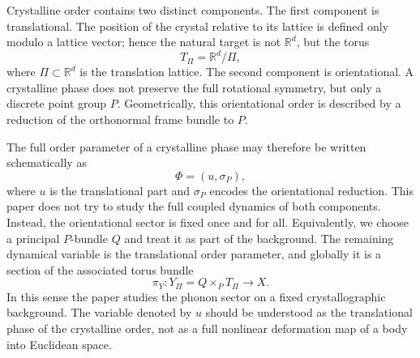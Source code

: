 \documentclass[11pt]{amsart}
\theoremstyle{plain}
\theoremstyle{definition}
\theoremstyle{remark}
\begin{document}
Crystalline order contains two distinct components. 
The first component is translational. The position of the crystal relative to its lattice is defined only modulo a lattice vector; hence the natural target is not \(\mathbb R^d\), but the torus
\[
T_\Pi=\mathbb{R}^d/\Pi,
\]
where \(\Pi\subset\mathbb{R}^d\) is the translation lattice. 
The second component is orientational. A crystalline phase does not preserve the full rotational symmetry, but only a discrete point group \(P\). 
Geometrically, this orientational order is described by a reduction of the orthonormal frame bundle to \(P\).

The full order parameter of a crystalline phase may therefore be written schematically as
\[
\Phi=(u,\sigma_P),
\]
where \(u\) is the translational part and \(\sigma_P\) encodes the orientational reduction. This paper does not try to study the full coupled dynamics of both components. Instead, the orientational sector is fixed once and for all. Equivalently, we choose a principal \(P\)-bundle \(Q\) and treat it as part of the background. The remaining dynamical variable is the translational order parameter, and globally it is a section of the associated torus bundle
\[
\pi_Y:Y_\Pi=Q\times_P T_\Pi\to X.
\]
In this sense the paper studies the phonon sector on a fixed crystallographic background. The variable denoted by \(u\) should be understood as the translational phase of the crystalline order, not as a full nonlinear deformation map of a body into Euclidean space.

\medskip
\end{document}

